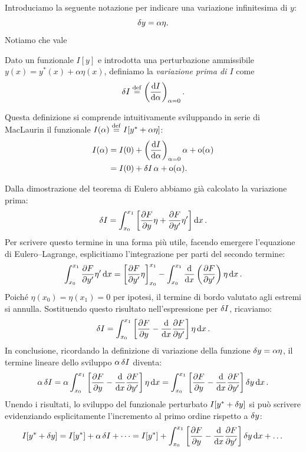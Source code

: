 Introduciamo la seguente notazione per indicare una variazione infinitesima di $y$:
\begin{equation*}
    \var{y} = \alpha \eta.
\end{equation*}
Notiamo che vale \begin{definition}
    Dato un funzionale $I[y]$ e introdotta una perturbazione ammissibile $y(x) = y^*(x) + \alpha \eta(x)$, definiamo la \emph{variazione prima di $I$} come
    \begin{equation*}
        \var{I} \overset{\mathrm{def}}{=} \left(\dv{I}{\alpha}\right)_{\alpha=0}.
    \end{equation*}
\end{definition}

Questa definizione si comprende intuitivamente sviluppando in serie di MacLaurin il funzionale $I(\alpha) \overset{\mathrm{def}}{=} I[y^* + \alpha \eta]$:
\begin{align*}
    I(\alpha) &= I(0) + \left(\dv{I}{\alpha}\right)_{\alpha=0} \alpha + \operatorname{o}(\alpha) \\
    &= I(0) + \var{I} \alpha + \operatorname{o}(\alpha).
\end{align*}

Dalla dimostrazione del teorema di Eulero abbiamo già calcolato la variazione prima:
\begin{equation*}
    \var{I} = \int_{x_0}^{x_1} \left[\pdv{F}{y}\eta + \pdv{F}{y'}\eta'\right] \dd{x}.
\end{equation*}
Per scrivere questo termine in una forma più utile, facendo emergere l'equazione di Eulero--Lagrange, esplicitiamo l'integrazione per parti del secondo termine:
\begin{equation*}
    \int_{x_0}^{x_1} \pdv{F}{y'}\eta'\dd{x} = \left[\pdv{F}{y'}\eta\right]_{x_0}^{x_1} - \int_{x_0}^{x_1} \dv{x}\left(\pdv{F}{y'}\right)\eta\dd{x}.
\end{equation*}
Poiché $\eta(x_0) = \eta(x_1) = 0$ per ipotesi, il termine di bordo valutato agli estremi si annulla. Sostituendo questo risultato nell'espressione per $\var{I}$, ricaviamo:
\begin{equation*}
    \var{I} = \int_{x_0}^{x_1} \left[\pdv{F}{y} - \dv{x} \pdv{F}{y'}\right] \eta \dd{x}.
\end{equation*}
In conclusione, ricordando la definizione di variazione della funzione $\var{y} = \alpha \eta$, il termine lineare dello sviluppo $\alpha\var{I}$ diventa:
\begin{equation*}
    \alpha\var{I} = \alpha \int_{x_0}^{x_1} \left[\pdv{F}{y} - \dv{x} \pdv{F}{y'}\right] \eta \dd{x} = \int_{x_0}^{x_1} \left[\pdv{F}{y} - \dv{x} \pdv{F}{y'}\right] \var{y} \dd{x}.
\end{equation*}
Unendo i risultati, lo sviluppo del funzionale perturbato $I[y^* + \var{y}]$ si può scrivere evidenziando esplicitamente l'incremento al primo ordine rispetto a $\var{y}$:
\begin{equation*}
    I[y^* + \var{y}] = I[y^*] + \alpha\var{I} + \dots = I[y^*] + \int_{x_0}^{x_1} \left[\pdv{F}{y} - \dv{x} \pdv{F}{y'}\right] \var{y} \dd{x} + \dots
\end{equation*}

